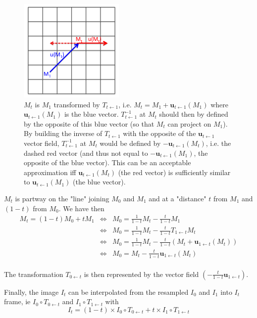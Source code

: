 \begin{figure}[ht]
\begin{center}
 \includegraphics[height=5cm]{figures/fig-invert-trsf.png}
\end{center}
\caption{\label{fig:invert:transformation}$M_t$ is $M_1$ transformed by $T_{t \leftarrow 1}$, i.e. $M_t = M_1 + \mathbf{u}_{t \leftarrow 1}(M_1) $ where $\mathbf{u}_{t \leftarrow 1}(M_1)$ is the blue vector. $T_{t \leftarrow 1}^{-1}$ at $M_t$ should then by defined by the opposite of this blue vector (so that $M_t$ can project on $M_1$). By building the inverse of $T_{t \leftarrow 1}$ with the opposite of the $\mathbf{u}_{t \leftarrow 1}$ vector field, $T_{t \leftarrow 1}^{-1}$ at $M_t$ would be defined by $- \mathbf{u}_{t \leftarrow 1}(M_t)$, i.e. the dashed red vector (and thus not equal to $- \mathbf{u}_{t \leftarrow 1}(M_1)$, the opposite of the blue vector). This can be an acceptable approximation iff $\mathbf{u}_{t \leftarrow 1}(M_t)$ (the red vector) is sufficiently similar to $\mathbf{u}_{t \leftarrow 1}(M_1)$ (the blue vector).}
\end{figure}

$M_t$ is partway on the "line" joining $M_0$ and $M_1$ and at a "distance" $t$   from $M_1$ and $(1-t)$ from $M_0$. 
We have then
\begin{eqnarray*}
M_t =  (1-t) M_0 + t M_1 
& \Leftrightarrow &
 M_0 = \frac{1}{1-t} M_t - \frac{t}{1-t} M_1 \\
& \Leftrightarrow &
 M_0
 = \frac{1}{1-t} M_t - \frac{t}{1-t} T_{1\leftarrow t} M_t \\
& \Leftrightarrow &
 M_0
 = \frac{1}{1-t} M_t - \frac{t}{1-t} 
 \left( M_t + \mathbf{u}_{1 \leftarrow t}(M_t) \right) \\
 & \Leftrightarrow &
 M_0
 =  M_t - \frac{t}{1-t} 
 \mathbf{u}_{1 \leftarrow t}(M_t) \\
\end{eqnarray*}

The transformation $T_{0 \leftarrow t}$ is then represented by the vector field $\left(- \frac{t}{1-t}\mathbf{u}_{1 \leftarrow t}\right)$.

Finally, the image $I_t$ can be interpolated from the resampled $I_0$ and $I_1$ into $I_t$ frame, ie $I_0 \circ T_{0 \leftarrow t}$ and $I_1 \circ T_{1 \leftarrow t}$ with
\begin{displaymath}
I_t = (1-t) \times I_0 \circ T_{0 \leftarrow t}
+ t \times I_1 \circ T_{1 \leftarrow t}
\end{displaymath}